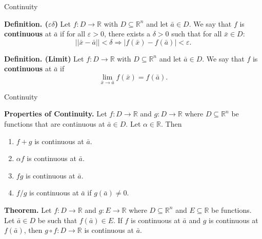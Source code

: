 \documentclass{beamer}
\begin{document}
    \begin{frame}[t]{Continuity}
        \begin{block}
            \par \textbf{Definition. ($\varepsilon \delta$)} Let $f: D \to \mathbb{R}$ with $D \subseteq \mathbb{R}^n$ and let $\bar{a} \in D$. We say that $f$ is \textbf{continuous} at $\bar{a}$ if for all $\varepsilon > 0$, there exists a $\delta > 0$ such that for all $\bar{x} \in D$:
            \begin{equation*}
                || \bar{x} - \bar{a} || < \delta \Rightarrow | f(\bar{x}) - f(\bar{a}) | < \varepsilon .
            \end{equation*}

            \par \textbf{Definition. (Limit)} Let $f: D \to \mathbb{R}$ with $D \subseteq \mathbb{R}^n$ and let $\bar{a} \in D$. We say that $f$ is \textbf{continuous} at $\bar{a}$ if
            \begin{equation*}
                \lim\limits_{\bar{x} \to \bar{a}} f(\bar{x}) = f(\bar{a}) .
            \end{equation*}
        \end{block}
    \end{frame}

    \begin{frame}[t]{Continuity}
        \begin{block}
            \par \textbf{Properties of Continuity.} Let $f: D \to \mathbb{R}$ and $g: D \to \mathbb{R}$ where $D \subseteq \mathbb{R}^n$ be functions that are continuous at $\bar{a} \in D$. Let $\alpha \in \mathbb{R}$. Then 
            \begin{enumerate}
                \item $f+g$ is continuous at $\bar{a}$.
                \item $\alpha f$ is continuous at $\bar{a}$.
                \item $fg$ is continuous at $\bar{a}$.
                \item $f/g$ is continuous at $\bar{a}$ if $g(\bar{a}) \neq 0$.
            \end{enumerate}
        \end{block}
        \begin{block}
            \par \textbf{Theorem.} Let $f: D \to \mathbb{R}$ and $g: E \to \mathbb{R}$ where $D \subseteq \mathbb{R}^n$ and $E \subseteq \mathbb{R}$ be functions. Let $\bar{a} \in D$ be such that $f(\bar{a}) \in E$. If $f$ is continuous at $\bar{a}$ and $g$ is continuous at $f(\bar{a})$, then $g \circ f : D \to \mathbb{R}$ is continuous at $\bar{a}$.
        \end{block}
    \end{frame}
\end{document}
